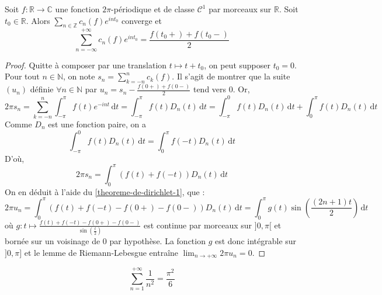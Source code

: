 	\begin{theorem}[Dirichlet]
		\label{theoreme-de-dirichlet-2}
		Soit $f : \mathbb{R} \rightarrow \mathbb{C}$ une fonction $2 \pi$-périodique et de classe $\mathcal{C}^1$ par morceaux sur $\mathbb{R}$. Soit $t_0 \in \mathbb{R}$. Alors $\sum_{n \in \mathbb{Z}} c_n(f) e^{int_0}$ converge et
		\[ \sum_{n = -\infty}^{+\infty} c_n(f) e^{int_0} = \frac{f(t_0+) + f(t_0-)}{2} \]
	\end{theorem}

	\begin{proof}
		Quitte à composer par une translation $t \mapsto t + t_0$, on peut supposer $t_0 = 0$. Pour tout $n \in \mathbb{N}$, on note $s_n = \sum_{k=-n}^n c_k(f)$. Il s'agit de montrer que la suite $(u_n)$ définie $\forall n \in \mathbb{N}$ par $u_n = s_n - \frac{f(0+) + f(0-)}{2}$ tend vers $0$. Or,
		\[ 2\pi s_n = \sum_{k=-n}^n \int_{-\pi}^{\pi} f(t) e^{-int} \, \mathrm{d}t = \int_{-\pi}^{\pi} f(t) D_n(t) \, \mathrm{d}t = \int^0_{-\pi} f(t) D_n(t) \, \mathrm{d}t + \int_0^{\pi} f(t) D_n(t) \, \mathrm{d}t \]
		Comme $D_n$ est une fonction paire, on a
		\[ \int^0_{-\pi} f(t) D_n(t) \, \mathrm{d}t = \int_0^{\pi} f(-t) D_n(t) \, \mathrm{d}t \]
		D'où,
		\[ 2 \pi s_n = \int_0^{\pi} (f(t) + f(-t)) D_n(t) \, \mathrm{d}t \]
		On en déduit à l'aide du \cref{theoreme-de-dirichlet-1}, que :
		\[ 2 \pi u_n = \int_0^{\pi} (f(t) + f(-t) - f(0+) - f(0-)) D_n(t) \, \mathrm{d}t = \int_0^{\pi} g(t) \sin \left ( \frac{(2n + 1)t}{2} \right) \, \mathrm{d}t \]
		où $g : t \mapsto \frac{f(t) + f(-t) - f(0+) - f(0-)}{\sin \left ( \frac{t}{2} \right)}$ est continue par morceaux sur $]0, \pi[$ et bornée sur un voisinage de $0$ par hypothèse. La fonction $g$ est donc intégrable sur $]0, \pi]$ et le lemme de Riemann-Lebesgue entraîne $\lim_{n \rightarrow +\infty} 2 \pi u_n = 0$.
	\end{proof}

	\begin{application}
		\[ \sum_{n=1}^{+\infty} \frac{1}{n^2} = \frac{\pi^2}{6} \]
	\end{application}

